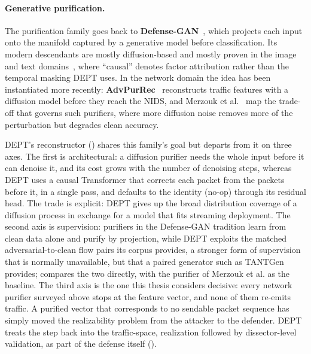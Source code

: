 \paragraph{Generative purification.}
The purification family goes back to \textbf{Defense-GAN}~\cite{samangouei2018defense},
which projects each input onto the manifold captured by a generative model before
classification. Its modern descendants are mostly diffusion-based and mostly proven in
the image and text domains~\cite{li2025adbm,zhang2024causaldiff,li2025diffusedef}, where
``causal'' denotes factor attribution rather than the temporal masking DEPT uses. In the
network domain the idea has been instantiated more
recently: \textbf{AdvPurRec}~\cite{alhussien2024advpurrec} reconstructs traffic
features with a diffusion model before they reach the \ac{NIDS}, and Merzouk et
al.~\cite{merzouk2024diffusion} map the trade-off that governs such purifiers, where
more diffusion noise removes more of the perturbation but degrades clean accuracy.

DEPT's reconstructor () shares this family's goal but
departs from it on three axes. The first is
architectural: a diffusion purifier needs the whole input before it can denoise it, and
its cost grows with the number of denoising steps, whereas DEPT uses a causal Transformer
that corrects each packet from the packets before it, in a single pass, and
defaults to the identity (no-op) through its residual head. The trade is explicit: DEPT gives
up the broad distribution coverage of a diffusion process in exchange for a model that
fits streaming deployment. The second axis is supervision: purifiers in the
Defense-GAN tradition learn from clean data alone and purify by projection, while DEPT
exploits the matched adversarial-to-clean flow pairs its corpus provides, a stronger
form of supervision that is normally unavailable, but that a paired generator such as
TANTGen provides;  compares the two directly, with the purifier
of Merzouk et al. as the baseline. The third axis is the one this thesis considers decisive: every network
purifier surveyed above stops at the feature vector, and none of them re-emits
traffic. A purified vector that corresponds to no sendable packet sequence has simply
moved the realizability problem from the attacker to the defender. DEPT treats the
step back into the traffic-space, realization followed by dissector-level validation,
as part of the defense itself ().

